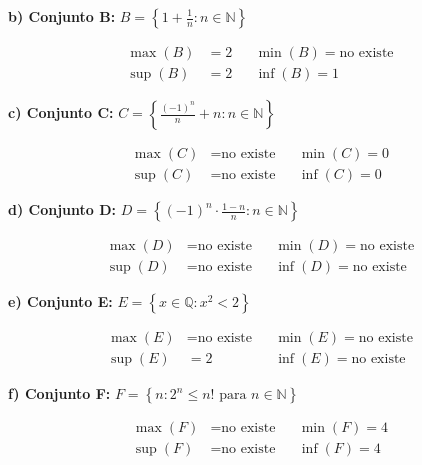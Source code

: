 \documentclass{article}
\begin{document}
\textbf{b) Conjunto B:} $B = \left\{ 1 + \frac{1}{n} : n \in \mathbb{N} \right\}$

\begin{align*}
\max(B) &= 2 && \min(B) = \text{no existe} \\
\sup(B) &= 2 && \inf(B) = 1
\end{align*}

\textbf{c) Conjunto C:} $C = \left\{ \frac{(-1)^n}{n}+n : n \in \mathbb{N} \right\}$

\begin{align*}
\max(C) &= \text{no existe} && \min(C) = 0 \\
\sup(C) &= \text{no existe} && \inf(C) = 0
\end{align*}

\textbf{d) Conjunto D:} $D = \left\{ (-1)^n \cdot \frac{1-n}{n} : n \in \mathbb{N} \right\}$

\begin{align*}
\max(D) &= \text{no existe} && \min(D) = \text{no existe} \\
\sup(D) &= \text{no existe} && \inf(D) = \text{no existe}
\end{align*}

\textbf{e) Conjunto E:} $E = \left\{ x \in \mathbb{Q} : x^2 < 2 \right\}$

\begin{align*}
\max(E) &= \text{no existe} && \min(E) = \text{no existe} \\
\sup(E) &= 2 && \inf(E) = \text{no existe}
\end{align*}

\textbf{f) Conjunto F:} $F = \left\{ n : 2^n \leq n! \text{ para } n \in \mathbb{N} \right\}$

\begin{align*}
\max(F) &= \text{no existe} && \min(F) = 4 \\
\sup(F) &= \text{no existe} && \inf(F) = 4
\end{align*}
\end{document}
